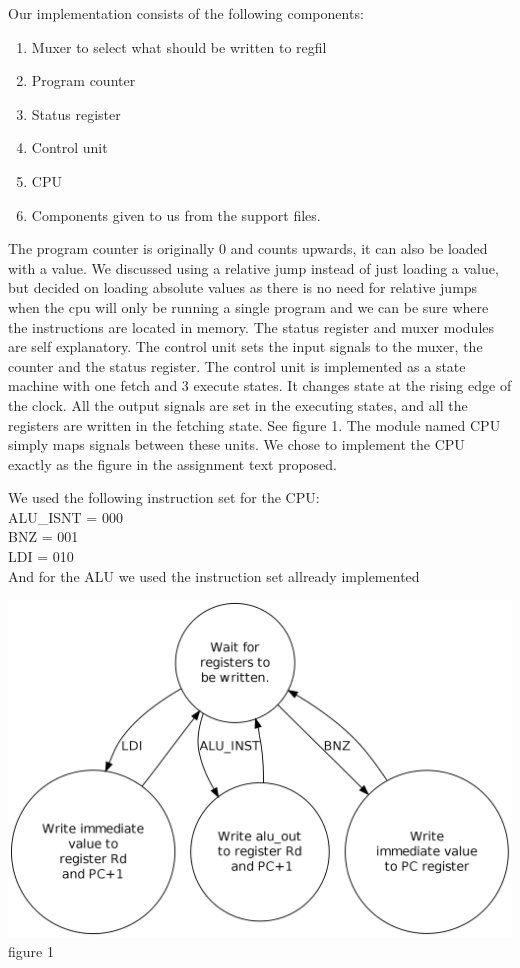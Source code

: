 \documentclass[10pt]{report}
\begin{document}
	Our implementation consists of the following components:
	\begin{enumerate}
		\item Muxer to select what should be written to regfil
		\item Program counter
		\item Status register
		\item Control unit
		\item CPU
		\item Components given to us from the support files.
	\end{enumerate}	
	The program counter is originally 0 and counts upwards, it can also be loaded with a value. We discussed using a relative jump instead of just loading a value, but decided on loading absolute values as there is no need for relative jumps when the cpu will only be running a single program and we can be sure where the instructions are located in memory.
	The status register and muxer modules are self explanatory.
	The control unit sets the input signals to the muxer, the counter and the status register. The control unit is implemented as a state machine with one fetch and 3 execute states. It changes state at the rising edge of the clock. All the output signals are set in the executing states, and all the registers are written in the fetching state. See figure 1. 
	The module named CPU simply maps signals between these units. We chose to implement the CPU exactly as the figure in the assignment text proposed. 

	We used the following instruction set for the CPU:\\
	ALU\_ISNT = 000\\
	BNZ = 001\\
	LDI = 010\\

	And for the ALU we used the instruction set allready implemented

	\begin{center}
	\includegraphics[width=.75\linewidth]{state_diagram.png} \\
	figure 1
	\end{center}
\end{document}
